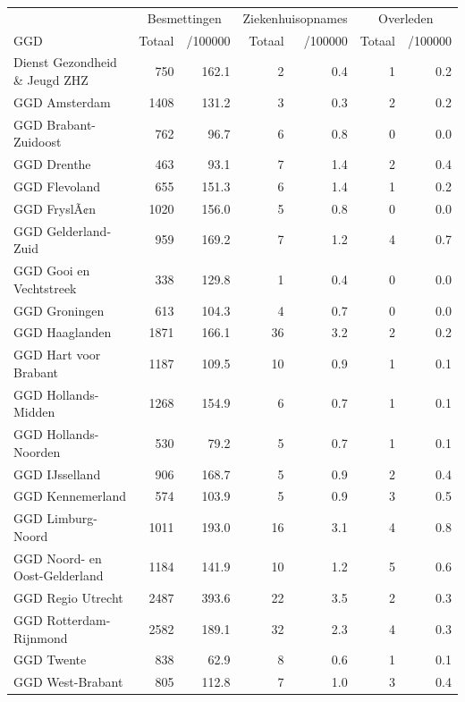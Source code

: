 \documentclass[
  english,
  man,floatsintext]{apa6}
\begin{document}
\begin{table}
\centering\begingroup\fontsize{10}{12}\selectfont

\begin{threeparttable}
\begin{tabular}{lrrrrrr}
\toprule
\multicolumn{1}{c}{ } & \multicolumn{2}{c}{Besmettingen} & \multicolumn{2}{c}{Ziekenhuisopnames} & \multicolumn{2}{c}{Overleden} \\
\cmidrule(l{3pt}r{3pt}){2-3} \cmidrule(l{3pt}r{3pt}){4-5} \cmidrule(l{3pt}r{3pt}){6-7}
GGD & Totaal & /100000 & Totaal & /100000 & Totaal & /100000\\
\midrule
Dienst Gezondheid \& Jeugd ZHZ & 750 & 162.1 & 2 & 0.4 & 1 & 0.2\\
GGD Amsterdam & 1408 & 131.2 & 3 & 0.3 & 2 & 0.2\\
GGD Brabant-Zuidoost & 762 & 96.7 & 6 & 0.8 & 0 & 0.0\\
GGD Drenthe & 463 & 93.1 & 7 & 1.4 & 2 & 0.4\\
GGD Flevoland & 655 & 151.3 & 6 & 1.4 & 1 & 0.2\\
GGD FryslÃ¢n & 1020 & 156.0 & 5 & 0.8 & 0 & 0.0\\
GGD Gelderland-Zuid & 959 & 169.2 & 7 & 1.2 & 4 & 0.7\\
GGD Gooi en Vechtstreek & 338 & 129.8 & 1 & 0.4 & 0 & 0.0\\
GGD Groningen & 613 & 104.3 & 4 & 0.7 & 0 & 0.0\\
GGD Haaglanden & 1871 & 166.1 & 36 & 3.2 & 2 & 0.2\\
GGD Hart voor Brabant & 1187 & 109.5 & 10 & 0.9 & 1 & 0.1\\
GGD Hollands-Midden & 1268 & 154.9 & 6 & 0.7 & 1 & 0.1\\
GGD Hollands-Noorden & 530 & 79.2 & 5 & 0.7 & 1 & 0.1\\
GGD IJsselland & 906 & 168.7 & 5 & 0.9 & 2 & 0.4\\
GGD Kennemerland & 574 & 103.9 & 5 & 0.9 & 3 & 0.5\\
GGD Limburg-Noord & 1011 & 193.0 & 16 & 3.1 & 4 & 0.8\\
GGD Noord- en Oost-Gelderland & 1184 & 141.9 & 10 & 1.2 & 5 & 0.6\\
GGD Regio Utrecht & 2487 & 393.6 & 22 & 3.5 & 2 & 0.3\\
GGD Rotterdam-Rijnmond & 2582 & 189.1 & 32 & 2.3 & 4 & 0.3\\
GGD Twente & 838 & 62.9 & 8 & 0.6 & 1 & 0.1\\
GGD West-Brabant & 805 & 112.8 & 7 & 1.0 & 3 & 0.4\\

\end{tabular}
\end{threeparttable}
\end{table}
\end{document}
